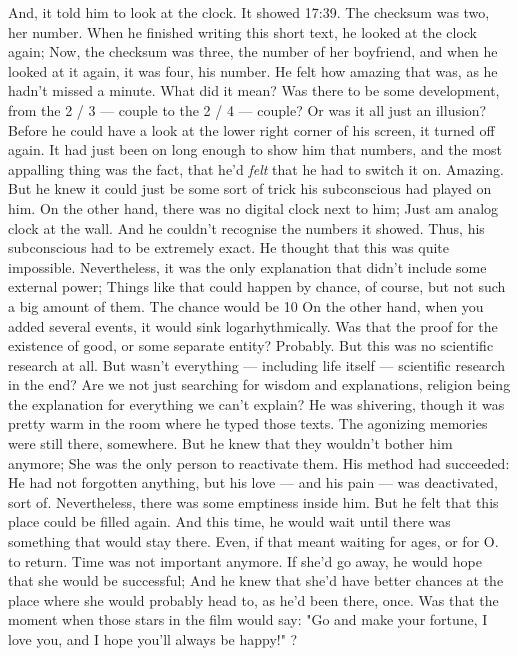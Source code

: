 And, it told him to look at the clock. 
It showed 17:39. 
The checksum was two, her number. 
When he finished writing this short text, he looked at the clock again; Now, the checksum was three, the number of her boyfriend, and when he looked at it again, it was four, his number. 
He felt how amazing that was, as he hadn't missed a minute. 
What did it mean? Was there to be some development, from the 2 / 3 --- couple to the 2 / 4 --- couple? Or was it all just an illusion?
Before he could have a look at the lower right corner of his screen, it turned off again. 
It had just been on long enough to show him that numbers, and the most appalling thing was the fact, that he'd \emph{felt} that he had to switch it on. 
Amazing. 
But he knew it could just be some sort of trick his subconscious had played on him. 
On the other hand, there was no digital clock next to him; Just am analog clock at the wall. 
And he couldn't recognise the numbers it showed. 
Thus, his subconscious had to be extremely exact. 
He thought that this was quite impossible. 
Nevertheless, it was the only explanation that didn't include some external power; Things like that could happen by chance, of course, but not such a big amount of them. 
The chance would be 10 %
On the other hand, when you added several events, it would sink logarhythmically. 
Was that the proof for the existence of good, or some separate entity?
Probably. 
But this was no scientific research at all. 
But wasn't everything --- including life itself --- scientific research in the end?
Are we not just searching for wisdom and explanations, religion being the explanation for everything we can't explain?
He was shivering, though it was pretty warm in the room where he typed those texts. 
The agonizing memories were still there, somewhere. 
But he knew that they wouldn't bother him anymore; She was the only person to reactivate them. 
His method had succeeded: He had not forgotten anything, but his love ---  and his pain --- was deactivated, sort of. 
Nevertheless, there was some emptiness inside him. But he felt that this place could be filled again. 
And this time, he would wait until there was something that would stay there. 
Even, if that meant waiting for ages, or for O. to return. 
Time was not important anymore. 
If she'd go away, he would hope that she would be successful; And he knew that she'd have better chances at the place where she would probably head to, as he'd been there, once. 
Was that the moment when those stars in the film would say: "Go and make your fortune, I love you, and I hope you'll always be happy!" ?
